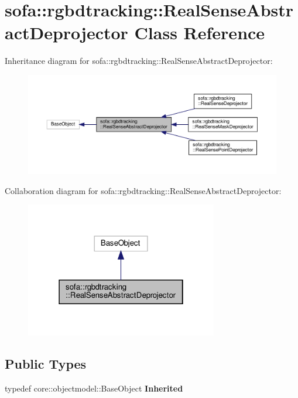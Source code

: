 \hypertarget{classsofa_1_1rgbdtracking_1_1_real_sense_abstract_deprojector}{}\section{sofa\+:\+:rgbdtracking\+:\+:Real\+Sense\+Abstract\+Deprojector Class Reference}
\label{classsofa_1_1rgbdtracking_1_1_real_sense_abstract_deprojector}


Inheritance diagram for sofa\+:\+:rgbdtracking\+:\+:Real\+Sense\+Abstract\+Deprojector\+:\nopagebreak
\begin{figure}[H]
\begin{center}
\leavevmode
\includegraphics[width=350pt]{classsofa_1_1rgbdtracking_1_1_real_sense_abstract_deprojector__inherit__graph}
\end{center}
\end{figure}


Collaboration diagram for sofa\+:\+:rgbdtracking\+:\+:Real\+Sense\+Abstract\+Deprojector\+:\nopagebreak
\begin{figure}[H]
\begin{center}
\leavevmode
\includegraphics[width=238pt]{classsofa_1_1rgbdtracking_1_1_real_sense_abstract_deprojector__coll__graph}
\end{center}
\end{figure}
\subsection*{Public Types}
\begin{DoxyCompactItemize}
\item 
\mbox{\label{classsofa_1_1rgbdtracking_1_1_real_sense_abstract_deprojector_a9b4cae154f99cca58b05da9c4b0084ab}} 
typedef core\+::objectmodel\+::\+Base\+Object {\bfseries Inherited}
\end{DoxyCompactItemize}
